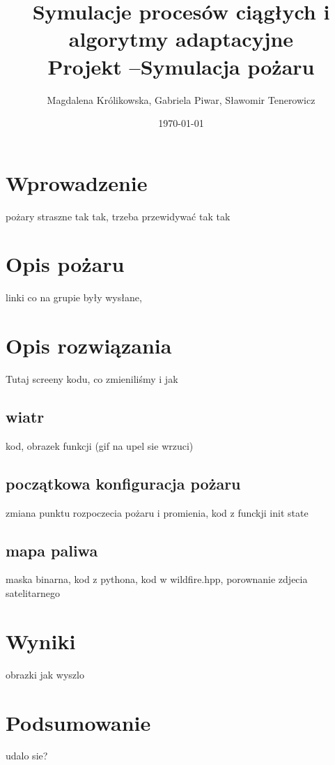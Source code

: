 \documentclass[onecolumn,12pt]{article}
\begin{document}
\title{Symulacje procesów ciągłych i algorytmy adaptacyjne\\
Projekt –Symulacja pożaru}
\author{Magdalena Królikowska, Gabriela Piwar, Sławomir Tenerowicz}
\date{\today}
\maketitle

\tableofcontents
\thispagestyle{empty}
\newpage

\section{Wprowadzenie}
pożary straszne tak tak, trzeba przewidywać tak tak

\section{Opis pożaru}
linki co na grupie były wysłane, 

\section{Opis rozwiązania}
Tutaj screeny kodu, co zmieniliśmy i jak

\subsection{wiatr}
kod, obrazek funkcji (gif na upel sie wrzuci)

\subsection{początkowa konfiguracja pożaru}
zmiana punktu rozpoczecia pożaru i promienia, kod z funckji init state

\subsection{mapa paliwa}
maska binarna, kod z pythona, kod w wildfire.hpp, porownanie zdjecia satelitarnego 

\section{Wyniki}
obrazki jak wyszlo

\section{Podsumowanie}
udalo sie? 

%
\end{document}
